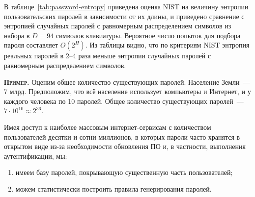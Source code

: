 \documentclass[10pt,a4paper,openany]{book}
\newcommand{\example}{\textsc{\textbf{Пример.}} }
\begin{document}
\begin{table}[!ht]
    \centering
    \caption{Оценка NIST предполагаемой энтропии паролей\label{tab:password-entropy}}
\end{table}

В таблице~\ref{tab:password-entropy} приведена оценка NIST на величину энтропии пользовательских паролей в зависимости от их длины, и приведено сравнение с энтропией случайных паролей с равномерным распределением символов из набора в $D=94$ символов клавиатуры. Вероятное число попыток для подбора пароля составляет $O(2^H)$. Из таблицы видно, что по критериям NIST энтропия реальных паролей в 2--4 раза меньше энтропии случайных паролей с равномерным распределением символов.

\example
Оценим общее количество существующих паролей. Население Земли~--- 7 млрд. Предположим, что всё население использует компьютеры и Интернет, и у каждого человека по 10 паролей. Общее количество существующих паролей~--- $7 \cdot 10^{10} \approx 2^{36}$.

Имея доступ к наиболее массовым интернет-сервисам с количеством пользователей десятки и сотни миллионов, в которых пароли часто хранятся в открытом виде из-за необходимости обновления ПО и, в частности, выполнения аутентификации, мы:
\begin{enumerate}
	\item имеем базу паролей, покрывающую существенную часть пользователей; 
	\item можем статистически построить правила генерирования паролей.
\end{enumerate}
\end{document}
